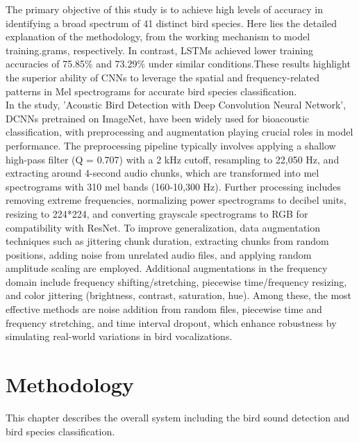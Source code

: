 The primary objective of this study is to achieve high levels of accuracy in identifying a broad spectrum of 41 distinct bird species. 
Here lies the detailed explanation of the methodology, from the working mechanism to model training.grams, 
respectively. In contrast, LSTMs achieved lower training accuracies of 75.85\% and 73.29\% 
under similar conditions.These results highlight the superior ability of CNNs to leverage 
the spatial and frequency-related patterns in Mel spectrograms for accurate bird species 
classification.\\ 

In the study\cite{lasseck2018acoustic}, 'Acoustic Bird Detection with Deep Convolution Neural Network', DCNNs pretrained 
on ImageNet, have been widely used for bioacoustic classification, with preprocessing and 
augmentation playing crucial roles in model performance. The preprocessing pipeline typically 
involves applying a shallow high-pass filter (Q = 0.707) with a 2 kHz cutoff, resampling to 22,050 Hz, 
and extracting around 4-second audio chunks, which are transformed into mel spectrograms with 310 mel bands 
(160-10,300 Hz). Further processing includes removing extreme frequencies, normalizing power 
spectrograms to decibel units, resizing to 224*224, and converting grayscale spectrograms to RGB 
for compatibility with ResNet. To improve generalization, data augmentation techniques such as 
jittering chunk duration, extracting chunks from random positions, adding noise from unrelated audio 
files, and applying random amplitude scaling are employed. Additional augmentations in the frequency 
domain include frequency shifting/stretching, piecewise time/frequency resizing, and color jittering 
(brightness, contrast, saturation, hue). Among these, the most effective methods are noise addition 
from random files, piecewise time and frequency stretching, and time interval dropout, which enhance 
robustness by simulating real-world variations in bird vocalizations.\\

\chapter{Methodology}
This chapter describes the overall system including the bird sound detection and bird species classification.

